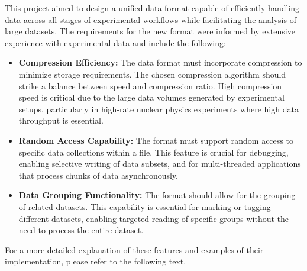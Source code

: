 This project aimed to design a unified data format capable of efficiently handling data across all stages of experimental workflows while facilitating the analysis of large datasets. The requirements for the new format were informed by extensive experience with experimental data and include the following:
\begin{itemize}
\item {\bf Compression Efficiency:} The data format must incorporate compression to minimize storage requirements. The chosen compression algorithm should strike a balance between speed and compression ratio. High compression speed is critical due to the large data volumes generated by experimental setups, particularly in high-rate nuclear physics experiments where high data throughput is essential.
\item {\bf Random Access Capability:} The format must support random access to specific data collections within a file. This feature is crucial for debugging, enabling selective writing of data subsets, and for multi-threaded applications that process chunks of data asynchronously.
\item {\bf Data Grouping Functionality:} The format should allow for the grouping of related datasets. This capability is essential for marking or tagging different datasets, enabling targeted reading of specific groups without the need to process the entire dataset.
\end{itemize}
For a more detailed explanation of these features and examples of their implementation, please refer to the following text.
